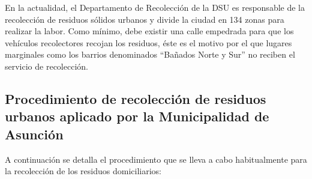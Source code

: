 
En la actualidad, el Departamento de Recolección de la DSU es responsable de la recolección de residuos sólidos urbanos y divide la ciudad en 134 zonas para realizar la labor. Como mínimo, debe existir una calle empedrada para que los vehículos recolectores recojan los residuos, éste es el motivo por el que lugares marginales como los barrios denominados ``Bañados Norte y Sur'' no reciben el servicio de recolección.


\subsection{Procedimiento de recolección de residuos urbanos aplicado por la Municipalidad de Asunción}

A continuación se detalla el procedimiento que se lleva a cabo habitualmente para la recolección de los residuos domiciliarios:

